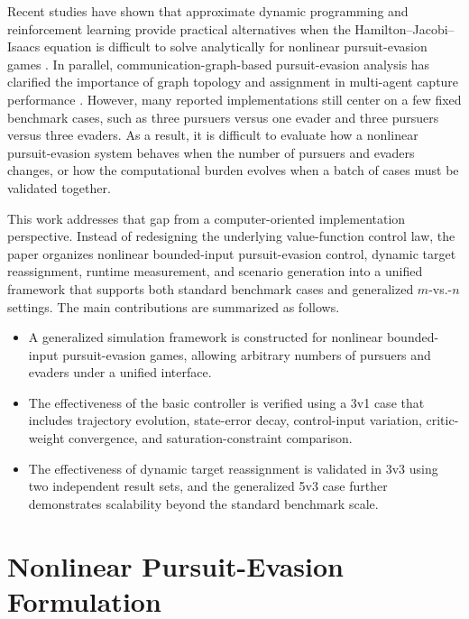﻿\documentclass[conference]{IEEEtran}
\begin{document}
Recent studies have shown that approximate dynamic programming and reinforcement learning provide practical alternatives when the Hamilton--Jacobi--Isaacs equation is difficult to solve analytically for nonlinear pursuit-evasion games \cite{song2016,huo2022,zhang2024distributed,xu2024}. In parallel, communication-graph-based pursuit-evasion analysis has clarified the importance of graph topology and assignment in multi-agent capture performance \cite{lopez2020,liu2021,vamvoudakis2012}. However, many reported implementations still center on a few fixed benchmark cases, such as three pursuers versus one evader and three pursuers versus three evaders. As a result, it is difficult to evaluate how a nonlinear pursuit-evasion system behaves when the number of pursuers and evaders changes, or how the computational burden evolves when a batch of cases must be validated together.

This work addresses that gap from a computer-oriented implementation perspective. Instead of redesigning the underlying value-function control law, the paper organizes nonlinear bounded-input pursuit-evasion control, dynamic target reassignment, runtime measurement, and scenario generation into a unified framework that supports both standard benchmark cases and generalized $m$-vs.-$n$ settings. The main contributions are summarized as follows.
\begin{itemize}
    \item A generalized simulation framework is constructed for nonlinear bounded-input pursuit-evasion games, allowing arbitrary numbers of pursuers and evaders under a unified interface.
    \item The effectiveness of the basic controller is verified using a 3v1 case that includes trajectory evolution, state-error decay, control-input variation, critic-weight convergence, and saturation-constraint comparison.
    \item The effectiveness of dynamic target reassignment is validated in 3v3 using two independent result sets, and the generalized 5v3 case further demonstrates scalability beyond the standard benchmark scale.
\end{itemize}

\section{Nonlinear Pursuit-Evasion Formulation}
\end{document}
